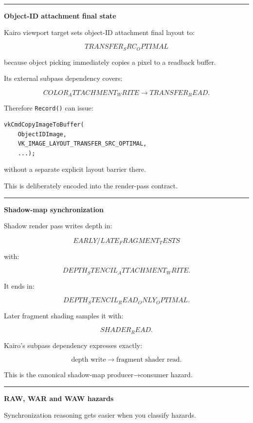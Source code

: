 \begin{center}\rule{0.5\linewidth}{0.5pt}\end{center}

\textbf{Object-ID attachment final state}

Kairo viewport target sets object-ID attachment final layout to:

\[
\boxed{
TRANSFER_SRC_OPTIMAL
}
\]

because object picking immediately copies a pixel to a readback buffer.

Its external subpass dependency covers:

\[
COLOR_ATTACHMENT_WRITE
\rightarrow
TRANSFER_READ.
\]

Therefore \texttt{Record()} can issue:

\begin{verbatim}
vkCmdCopyImageToBuffer(
    ObjectIDImage,
    VK_IMAGE_LAYOUT_TRANSFER_SRC_OPTIMAL,
    ...);
\end{verbatim}

without a separate explicit layout barrier there.

This is deliberately encoded into the render-pass contract.

\begin{center}\rule{0.5\linewidth}{0.5pt}\end{center}

\textbf{Shadow-map synchronization}

Shadow render pass writes depth in:

\[
EARLY/LATE_FRAGMENT_TESTS
\]

with:

\[
DEPTH_STENCIL_ATTACHMENT_WRITE.
\]

It ends in:

\[
DEPTH_STENCIL_READ_ONLY_OPTIMAL.
\]

Later fragment shading samples it with:

\[
SHADER_READ.
\]

Kairo's subpass dependency expresses exactly:

\[
\text{depth write}
\rightarrow
\text{fragment shader read}.
\]

This is the canonical shadow-map producer→consumer hazard.

\begin{center}\rule{0.5\linewidth}{0.5pt}\end{center}

\textbf{RAW, WAR and WAW hazards}

Synchronization reasoning gets easier when you classify hazards.

